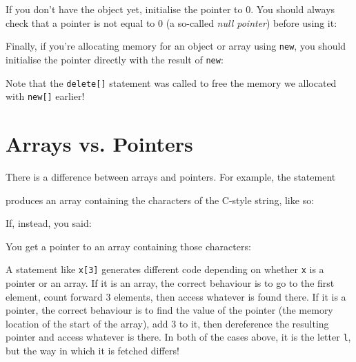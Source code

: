 \documentclass[a4paper]{scrartcl}
\begin{document}


If you don't have the object yet, initialise the pointer to 0. You should always check that a pointer is not equal to 0 (a so-called \emph{null pointer}) before using it:



Finally, if you're allocating memory for an object or array using \texttt{new}, you should initialise the pointer directly with the result of \texttt{new}:



Note that the \verb|delete[]| statement was called to free the memory we allocated with \verb|new[]| earlier!

\section{Arrays vs. Pointers}
There is a difference between arrays and pointers. For example, the statement



produces an array containing the characters of the C-style string, like so:


If, instead, you said:



You get a pointer to an array containing those characters:


A statement like \verb|x[3]| generates different code depending on whether \verb|x| is a pointer or an array. If it is an array, the correct behaviour is to go to the first element, count forward $3$ elements, then access whatever is found there. If it is a pointer, the correct behaviour is to find the value of the pointer (the memory location of the start of the array), add $3$ to it, then dereference the resulting pointer and access whatever is there. In both of the cases above, it is the letter \verb|l|, but the way in which it is fetched differs!
\end{document}
